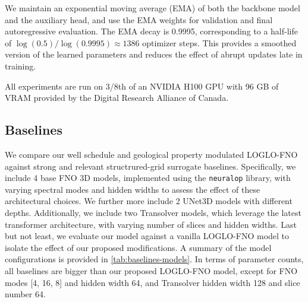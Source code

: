 \documentclass[pdflatex,sn-mathphys-ay]{sn-jnl}
\begin{document}
We maintain an exponential moving average (EMA) \citep{} of both the backbone model and
the auxiliary head, and use the EMA weights for validation and final
autoregressive evaluation. The EMA decay is 0.9995, corresponding to a half-life
of \(\log(0.5)/\log(0.9995)\approx 1386\) optimizer steps. This provides a
smoothed version of the learned parameters and reduces the effect of abrupt
updates late in training.

All experiments are run on 3/8th of an NVIDIA H100 GPU with 96 GB of VRAM provided
by the Digital Research Alliance of Canada.

\subsection{Baselines}
\label{sec:baselines}
We compare our well schedule and geological property modulated LOGLO-FNO against strong and 
relevant structrured-grid surrogate baselines. Specifically, we include 4 base FNO 3D models,
implemented using the \texttt{neuralop} library, with varying spectral modes and hidden widths to 
assess the effect of these architectural choices. We further more include 2 UNet3D models with different depths.
Additionally, we include two Transolver models, which leverage the latest transformer architecture, with varying
number of slices and hidden widths. Last but not least, we evaluate our model against a vanilla LOGLO-FNO model
to isolate the effect of our proposed modifications. A summary of the model configurations is provided 
in \cref{tab:baselines-models}. In terms of parameter counts, all baselines are bigger than 
our proposed LOGLO-FNO model, except for FNO modes [4, 16, 8] and hidden width 64, and Transolver
hidden width 128 and slice number 64.
\end{document}
